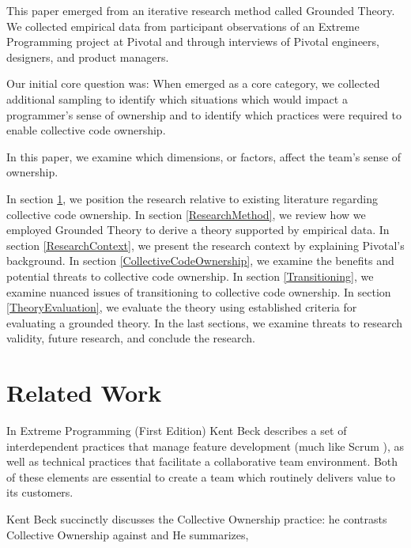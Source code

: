 This paper emerged from an iterative research method called Grounded Theory. We collected empirical data from participant observations of an Extreme Programming project at Pivotal and through interviews of Pivotal engineers, designers, and product managers. %

Our initial core question was:  When  emerged as a core category, we collected additional sampling to identify which situations which would impact a programmer's sense of ownership and to identify which practices were required to enable collective code ownership. 

In this paper, we examine which dimensions, or factors, affect the team's sense of ownership.

In section \ref{RelatedWork}, we position the research relative to existing literature regarding collective code ownership. In section \ref{ResearchMethod}, we review how we employed Grounded Theory to derive a theory supported by empirical data. In section \ref{ResearchContext}, we present the research context by explaining Pivotal's background. In section \ref{CollectiveCodeOwnership}, we examine the benefits and potential threats to collective code ownership. In section \ref{Transitioning}, we examine nuanced issues of transitioning to collective code ownership. In section \ref{TheoryEvaluation}, we evaluate the theory using established criteria for evaluating a grounded theory. In the last sections, we examine threats to research validity, future research, and conclude the research.



\section{Related Work}
\label{RelatedWork}
In Extreme Programming (First Edition) \cite{ExtremeProgramming2000} Kent Beck describes a set of interdependent practices that manage feature development (much like Scrum \cite{Scrum}), as well as technical practices that facilitate a collaborative team environment. Both of these elements are essential to create a team which routinely delivers value to its customers.

Kent Beck succinctly discusses the Collective Ownership practice: he contrasts Collective Ownership against  and  He summarizes,   \cite{ExtremeProgramming2000}


